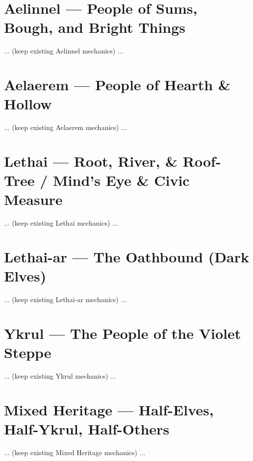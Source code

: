 \clearpage
\section{Aelinnel — People of Sums, Bough, and Bright Things}
\label{sec:aelinnel-detailed}
... (keep existing Aelinnel mechanics) ...

\clearpage
\section{Aelaerem — People of Hearth \& Hollow}
\label{sec:aelaerem-detailed}
... (keep existing Aelaerem mechanics) ...

\clearpage
\section{Lethai — Root, River, \& Roof-Tree / Mind’s Eye \& Civic Measure}
\label{sec:lethai-detailed}
... (keep existing Lethai mechanics) ...

\clearpage
\section{Lethai-ar — The Oathbound (Dark Elves)}
\label{sec:lethaiar-detailed}
... (keep existing Lethai-ar mechanics) ...

\clearpage
\section{Ykrul — The People of the Violet Steppe}
\label{sec:ykrul-detailed}
... (keep existing Ykrul mechanics) ...

\clearpage
\section{Mixed Heritage — Half-Elves, Half-Ykrul, Half-Others}
\label{sec:mixed-heritage}
... (keep existing Mixed Heritage mechanics) ...